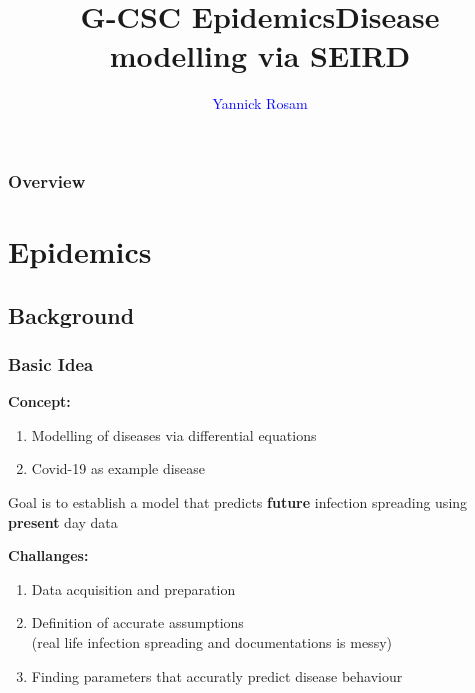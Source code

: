 \documentclass{beamer}
\title[Epidemics Wokrshop]{G-CSC Epidemics\newline Disease modelling via SEIRD}
\author{\textcolor{blue}{Yannick Rosam\\}}
\institute[G-CSC] %
{
Goethe Universtiy Frankfurt - Center for Scientific Computing \\ %
\medskip
}
\begin{document}


\begin{frame}
\titlepage %
\end{frame}


\begin{frame}
\frametitle{Overview} 
\tableofcontents 
\end{frame}



\section{Epidemics}
\subsection{Background}

\begin{frame}
	\frametitle{Basic Idea}
	\textbf{Concept:}
	\begin{enumerate}[$\bullet$]
		\item Modelling of diseases via differential equations
		\item Covid-19 as example disease\\
	\end{enumerate}
	\textit{ }\newline
	Goal is to establish a model that predicts \textbf{future} infection spreading using \textbf{present} day data\newline
	
	\textbf{Challanges:}
	\begin{enumerate}[$\bullet$]
		\item Data acquisition and preparation
		\item Definition of accurate assumptions\\
			(real life infection spreading and documentations is messy)
		\item Finding parameters that accuratly predict disease behaviour
	\end{enumerate}

\end{frame}
\end{document}
